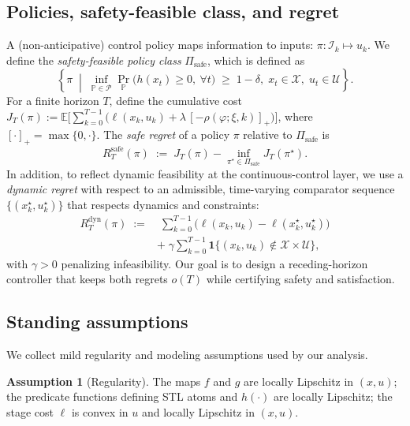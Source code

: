 \documentclass[journal]{IEEEtran}
\theoremstyle{definition}
\newtheorem{assumption}{Assumption}
\begin{document}
\subsection{Policies, safety-feasible class, and regret}
A (non-anticipative) control policy maps information to inputs: $\pi:\mathcal{I}_k\mapsto u_k$.
We define the \emph{safety-feasible policy class} $\Pi_{\text{safe}}$, which is defined as
\begin{equation}
  \left\{ \pi \;\middle|\;
    \inf_{\mathbb{P}\in\mathcal{P}}
    \Pr_{\mathbb{P}}\!\big(h(x_t)\ge 0,\ \forall t\big)\;\ge\; 1-\delta,\;
    x_t\in\mathcal{X},\; u_t\in\mathcal{U}
  \right\}.
  \label{eq:safe-class}
\end{equation}
For a finite horizon $T$, define the cumulative cost
$J_T(\pi):=\mathbb{E}\big[\sum_{k=0}^{T-1}\big(\ell(x_k,u_k)
+\lambda\,[ -\rho(\varphi;\xi,k)]_{+}\big)\big]$, where $[\cdot]_+=\max\{0,\cdot\}$.
The \emph{safe regret} of a policy $\pi$ relative to $\Pi_{\text{safe}}$ is
\begin{equation}
  R_T^{\text{safe}}(\pi)
  \;:=\;
  J_T(\pi) - \inf_{\pi^\star\in\Pi_{\text{safe}}} J_T(\pi^\star).
  \label{eq:safe-regret}
\end{equation}
In addition, to reflect dynamic feasibility at the continuous-control layer, we use a
\emph{dynamic regret} with respect to an admissible, time-varying comparator sequence
$\{(x_k^\star,u_k^\star)\}$ that respects dynamics and constraints:
\begin{equation}
\begin{array}{ll}
  R_T^{\text{dyn}}(\pi)
  \;:=&\;
  \sum_{k=0}^{T-1}\big(\ell(x_k,u_k)-\ell(x_k^\star,u_k^\star)\big)\\
  \;&+\; \gamma \sum_{k=0}^{T-1} \mathbf{1}\{(x_k,u_k)\notin\mathcal{X}\times\mathcal{U}\},
\end{array}
  \label{eq:dynamic-regret}
\end{equation}
with $\gamma>0$ penalizing infeasibility. Our goal is to design a receding-horizon controller that
keeps both regrets $o(T)$ while certifying safety and satisfaction.

\subsection{Standing assumptions}
We collect mild regularity and modeling assumptions used by our analysis.

\begin{assumption}[Regularity]
\label{ass:regularity}
The maps $f$ and $g$ are locally Lipschitz in $(x,u)$; the predicate functions defining STL
atoms and $h(\cdot)$ are locally Lipschitz; the stage cost $\ell$ is convex in $u$ and locally
Lipschitz in $(x,u)$.
\end{assumption}
\end{document}
